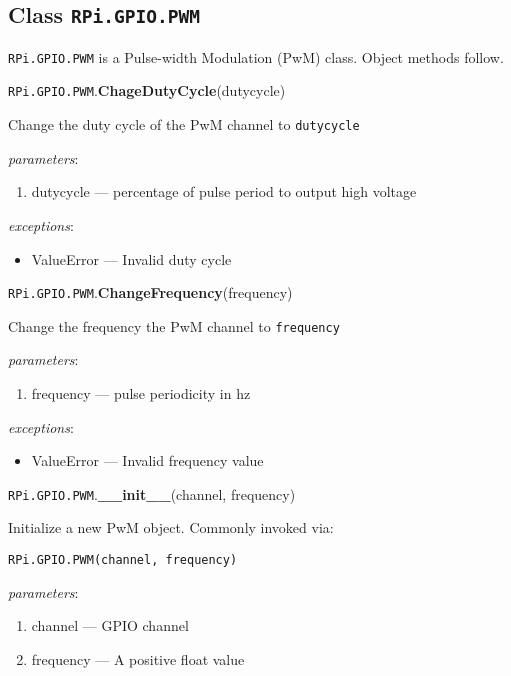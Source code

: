 \documentclass[12pt]{article}
\begin{document}
\subsection{Class \texttt{RPi.GPIO.PWM}} \label{pwm}
    
\texttt{RPi.GPIO.PWM} is a Pulse-width Modulation (PwM) class. Object methods follow.

\medskip \medskip

\noindent \texttt{RPi.GPIO.PWM}.\textbf{ChageDutyCycle}(dutycycle)
        
Change the duty cycle of the PwM channel to \texttt{dutycycle}
        
\textit{parameters}:
\begin{enumerate}      
        \item dutycycle --- percentage of pulse period to output high voltage
\end{enumerate}
 
 
\textit{exceptions}:
\begin{itemize}
    \item ValueError --- Invalid duty cycle
\end{itemize}

\noindent \texttt{RPi.GPIO.PWM}.\textbf{ChangeFrequency}(frequency)
        
Change the frequency the PwM channel to \texttt{frequency}
        
\textit{parameters}:
\begin{enumerate}      
        \item frequency --- pulse periodicity in hz
\end{enumerate}
 
 
\textit{exceptions}:
\begin{itemize}
    \item ValueError --- Invalid frequency value
\end{itemize}

\noindent \texttt{RPi.GPIO.PWM}.\textbf{\_\_init\_\_}(channel, frequency)
        
Initialize a new PwM object. Commonly invoked via:

\texttt{RPi.GPIO.PWM(channel, frequency)}

\textit{parameters}:
\begin{enumerate}
        \item channel --- GPIO channel
        \item frequency --- A positive float value
\end{enumerate}
 
\end{document}
